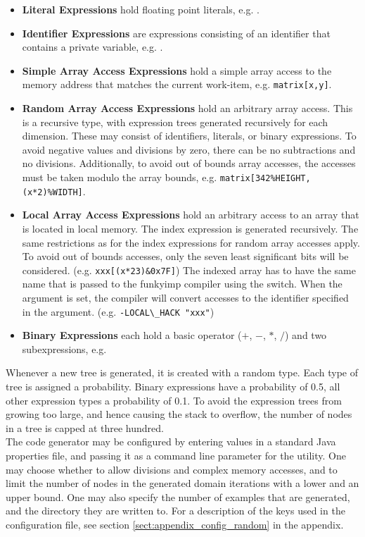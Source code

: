 \begin{itemize}
	\item \textbf{Literal Expressions} hold floating point literals, e.g. .
	\item \textbf{Identifier Expressions} are expressions consisting of an identifier that contains a private variable, e.g. .
	\item \textbf{Simple Array Access Expressions} hold a simple array access to the memory address that matches the current work-item, e.g. \verb!matrix[x,y]!.
	\item \textbf{Random Array Access Expressions} hold an arbitrary array access. This is a recursive type, with expression trees generated recursively for each dimension. These may consist of identifiers, literals, or binary expressions. To avoid negative values and divisions by zero, there can be no subtractions and no divisions. Additionally, to avoid out of bounds array accesses, the accesses must be taken modulo the array bounds, e.g. \verb!matrix[342%HEIGHT, (x*2)%WIDTH]!.
    \item \textbf{Local Array Access Expressions} hold an arbitrary access to an array that is located in local memory. The index expression is generated recursively. The same restrictions as for the index expressions for random array accesses apply. To avoid out of bounds accesses, only the seven least significant bits will be considered. (e.g. \verb!xxx[(x*23)&0x7F]!) The indexed array has to have the same name that is passed to the funkyimp compiler using the  switch. When the argument is set, the compiler will convert accesses to the identifier specified in the argument. (e.g. \verb!-LOCAL\_HACK "xxx"!)
	\item \textbf{Binary Expressions} each hold a basic operator ($+$, $-$, $*$, $/$) and two subexpressions, e.g. 
\end{itemize}

Whenever a new tree is generated, it is created with a random type. Each type of tree is assigned a probability. Binary expressions have a probability of 0.5, all other expression types a probability of 0.1. To avoid the expression trees from growing too large, and hence causing the stack to overflow, the number of nodes in a tree is capped at three hundred. \\

The code generator may be configured by entering values in a standard Java properties file, and passing it as a command line parameter for the utility. One may choose whether to allow divisions and complex memory accesses, and to limit the number of nodes in the generated domain iterations with a lower and an upper bound. One may also specify the number of examples that are generated, and the directory they are written to. For a description of the keys used in the configuration file, see section \ref{sect:appendix_config_random} in the appendix. \\

